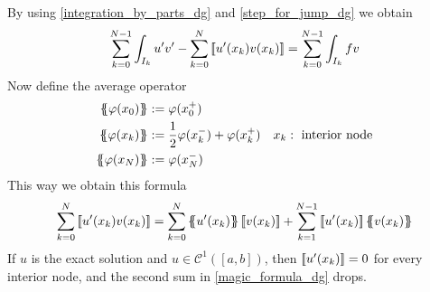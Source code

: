 By using \eqref{integration_by_parts_dg} and \eqref{step_for_jump_dg} we obtain 
\begin{equation}
    \sum_{k=0}^{N-1} \int_{I_k} u'v' - \sum_{k=0}^{N} \left[\!\left[u'(x_k)v(x_k)\right]\!\right] = \sum_{k=0}^{N-1} \int_{I_k} fv \label{almost_bilinear_dg}
\end{equation}
Now define the average operator 
\begin{align}
    \average{\phi(x_0)} &:= \phi(x^+_0) & \nonumber\\
    \average{\phi(x_k)} &:= \frac{1}{2}\phi(x_k^-) +\phi(x^+_k) & x_k : \txt{ interior node} \\
    \average{\phi(x_N)} &:= \phi(x^-_N) &\nonumber \label{average_function}
\end{align}
This way we obtain this formula 
\begin{equation}
    \sum_{k=0}^{N} \jump{u'(x_k)v(x_k)} = \sum_{k=0}^{N} \average{u'(x_k)} \jump{v(x_k)} + \sum_{k=1}^{N-1} \jump{u'(x_k)}\average{v(x_k)}\label{magic_formula_dg}
\end{equation}
If \(u\) is the exact solution and \(u \in \mathcal{C}^1([a,b])\), then \(\left[\!\left[u'(x_k)\right]\!\right] = 0\) for every interior node, and the second sum in \eqref{magic_formula_dg} drops.


